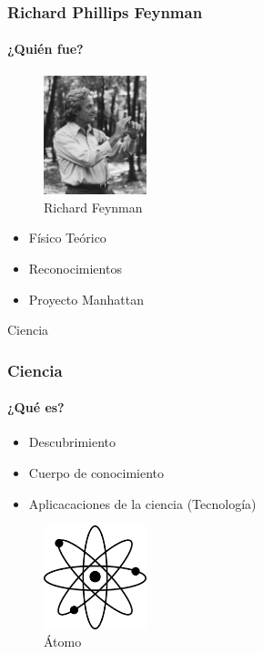 \documentclass{beamer}
\begin{document}
\begin{frame}
  \frametitle{Richard Phillips Feynman}
  \framesubtitle{¿Quién fue?}
    \begin{multicols}{2}
    \begin{figure}[htp]
        \centering
        \includegraphics[width=3cm]{images/RF}
        \caption{Richard Feynman}
    \end{figure}

  \begin{itemize}
    \item Físico Teórico
    \item Reconocimientos
    \item Proyecto Manhattan 
  \end{itemize}
  \end{multicols}
 
\end{frame}


\begin{frame}{Ciencia}
    \frametitle{Ciencia}
    \framesubtitle{¿Qué es?}
    
    \begin{multicols}{2}
      
      \begin{itemize}
        \item Descubrimiento
        \item Cuerpo de conocimiento
        \item Aplicacaciones de la ciencia (Tecnología)
      \end{itemize}
      
      \begin{figure}[htp]
        \centering
        \includegraphics[width=3cm]{images/atomo}
        \caption{Átomo}
    \end{figure}
    \end{multicols}
\end{frame}
\end{document}
